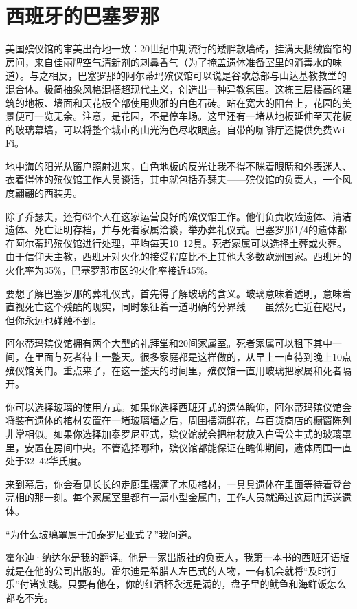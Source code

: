 \documentclass[12pt,oneside]{book}
\begin{document}
\section{西班牙的巴塞罗那}
\begin{bookref}[frametitle={\cite{好好告别：世界葬礼观察手记}}]

美国殡仪馆的审美出奇地一致：20世纪中期流行的矮胖款墙砖，挂满天鹅绒窗帘的房间，来自佳丽牌空气清新剂的刺鼻香气（为了掩盖遗体准备室里的消毒水的味道）。与之相反，巴塞罗那的阿尔蒂玛殡仪馆可以说是谷歌总部与山达基教教堂的混合体。极简抽象风格混搭超现代主义，创造出一种异教氛围。这栋三层楼高的建筑的地板、墙面和天花板全部使用典雅的白色石砖。站在宽大的阳台上，花园的美景便可一览无余。注意，是花园，不是停车场。这里还有一堵从地板延伸至天花板的玻璃幕墙，可以将整个城市的山光海色尽收眼底。自带的咖啡厅还提供免费Wi-Fi。

地中海的阳光从窗户照射进来，白色地板的反光让我不得不眯着眼睛和外表迷人、衣着得体的殡仪馆工作人员谈话，其中就包括乔瑟夫——殡仪馆的负责人，一个风度翩翩的西装男。

除了乔瑟夫，还有63个人在这家运营良好的殡仪馆工作。他们负责收殓遗体、清洁遗体、死亡证明存档，并与死者家属洽谈，举办葬礼仪式。巴塞罗那1/4的遗体都在阿尔蒂玛殡仪馆进行处理，平均每天10~12具。死者家属可以选择土葬或火葬。由于信仰天主教，西班牙对火化的接受程度比不上其他大多数欧洲国家。西班牙的火化率为35\%，巴塞罗那市区的火化率接近45\%。

要想了解巴塞罗那的葬礼仪式，首先得了解玻璃的含义。玻璃意味着透明，意味着直视死亡这个残酷的现实，同时象征着一道明确的分界线——虽然死亡近在咫尺，但你永远也碰触不到。

阿尔蒂玛殡仪馆拥有两个大型的礼拜堂和20间家属室。死者家属可以租下其中一间，在里面与死者待上一整天。很多家庭都是这样做的，从早上一直待到晚上10点殡仪馆关门。重点来了，在这一整天的时间里，殡仪馆一直用玻璃把家属和死者隔开。

你可以选择玻璃的使用方式。如果你选择西班牙式的遗体瞻仰，阿尔蒂玛殡仪馆会将装有遗体的棺材安置在一堵玻璃墙之后，周围摆满鲜花，与百货商店的橱窗陈列非常相似。如果你选择加泰罗尼亚式，殡仪馆就会把棺材放入白雪公主式的玻璃罩里，安置在房间中央。不管选择哪种，殡仪馆都能保证在瞻仰期间，遗体周围一直处于32~42华氏度。

来到幕后，你会看见长长的走廊里摆满了木质棺材，一具具遗体在里面等待着登台亮相的那一刻。每个家属室里都有一扇小型金属门，工作人员就通过这扇门运送遗体。

“为什么玻璃罩属于加泰罗尼亚式？”我问道。

霍尔迪·纳达尔是我的翻译。他是一家出版社的负责人，我第一本书的西班牙语版就是在他的公司出版的。霍尔迪是希腊人左巴式的人物，一有机会就将“及时行乐”付诸实践。只要有他在，你的红酒杯永远是满的，盘子里的鱿鱼和海鲜饭怎么都吃不完。


\end{bookref}
\end{document}
